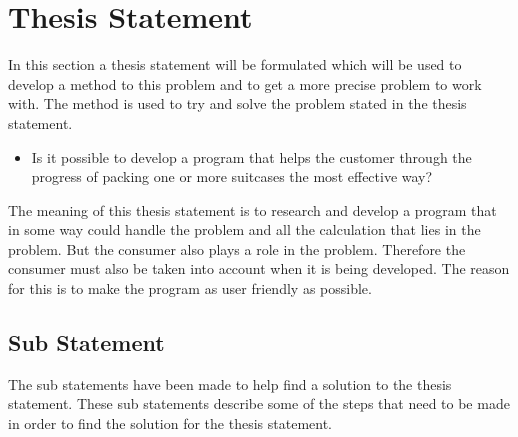 \section{Thesis Statement}
In this section a thesis statement will be formulated which will be used to develop a method to this problem and to get a more precise problem to work with. The method is used to try and solve the problem stated in the thesis statement.

\begin{itemize}
\item Is it possible to develop a program that helps the customer through the progress of packing one or more suitcases the most effective way?
\end{itemize}

The meaning of this thesis statement is to research and develop a program that in some way could handle the problem and all the calculation that lies in the problem. But the consumer also plays a role in the problem.
Therefore the consumer must also be taken into account when it is being developed. The reason for this is to make the program as user friendly as possible.

\subsection*{Sub Statement}
The sub statements have been made to help find a solution to the thesis statement. These sub statements describe some of the steps that need to be made in order to find the solution for the thesis statement.


